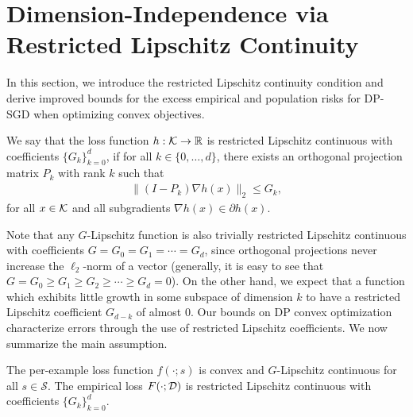 \section[Dimension-Independence via Restricted Lipschitz Continuity]{Dimension-Independence via \\Restricted Lipschitz Continuity}\label{sec:theory}
In this section, we introduce the restricted Lipschitz continuity condition and derive improved bounds for the excess empirical and population risks for DP-SGD when optimizing convex objectives.

\begin{defi}
We say that the loss function $h: \mathcal K \to \mathbb{R}$ is restricted Lipschitz continuous with coefficients $\{G_k\}_{k=0}^d$, if
for all $k \in \{0, \dots, d\}$, there exists an orthogonal projection matrix $P_k$ with rank $k$ such that 
\begin{align*}
    \|(I-P_k)\nabla h(x) \|_2\le G_k,
\end{align*}
for all $x \in \mathcal K$ and all subgradients $\nabla h(x) \in \partial h(x)$.
\end{defi}

Note that any $G$-Lipschitz function is also trivially restricted Lipschitz continuous with coefficients $G = G_0 = G_1 = \cdots = G_d$, since orthogonal projections never increase the $\ell_2$-norm of a vector (generally, it is easy to see that $G = G_{0}\ge G_{1}\geq G_{2}\geq\cdots\geq G_{d}=0$). 
On the other hand, we expect that a function which exhibits little growth in some subspace of dimension $k$ to have a restricted Lipschitz coefficient $G_{d-k}$ of almost 0.
Our bounds on DP convex optimization characterize errors through the use of restricted Lipschitz coefficients. 
We now summarize the main assumption.
\begin{assu}
\label{assm:G_k}
The per-example loss function $f(\cdot; s)$ is convex and $G$-Lipschitz continuous for all $s \in \mathcal{S}$.
The empirical loss $F(\cdot; \mathcal D)$ is restricted Lipschitz continuous with coefficients $\{G_k\}_{k = 0}^d$.
\end{assu}

